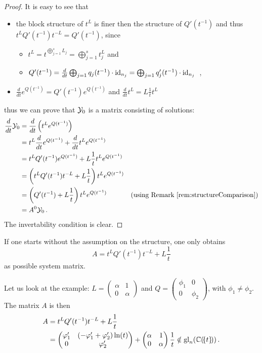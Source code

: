 \begin{proof}
  It is easy to see that
  \begin{itemize}
    \item the block structure of $t^L$ is finer then the structure of
      $Q'(t^{-1})$ and thus $t^LQ'(t^{-1})t^{-L}=Q'(t^{-1})$, since
      \begin{itemize}
        \item $t^L=t^{\bigoplus_{j=1}^sL_j}=\bigoplus_{j=1}^st^L_j$ and
        \item $Q'(t^{-1})=\frac{d}{dt}\bigoplus_{j=1}q_j(t^{-1})\cdot\operatorname{id}_{n_j}=
          \bigoplus_{j=1}q'_j(t^{-1})\cdot\operatorname{id}_{n_j}$ \,,
      \end{itemize}
    \item $\frac{d}{dt}e^{Q(t^{-1})}=Q'(t^{-1})e^{Q(t^{-1})}$ and
      $\frac{d}{dt}t^L=L\frac{1}{t}t^L$
  \end{itemize}
  thus we can prove that $\mathcal{Y}_0$ is a matrix consisting of solutions:
  \begin{align*}
    \frac{d}{dt}\mathcal{Y}_0
    &=\frac{d}{dt}\left(t^Le^{Q(t^{-1})}\right)
  \\&= t^L\frac{d}{dt}e^{Q(t^{-1})} + \frac{d}{dt}t^Le^{Q(t^{-1})}
  \\&= t^LQ'(t^{-1})e^{Q(t^{-1})} + L\frac{1}{t}t^Le^{Q(t^{-1})}
  \\&=\left(t^LQ'(t^{-1})t^{-L}+L\frac{1}{t}\right)t^Le^{Q(t^{-1})}
  \\&=\left(Q'(t^{-1})+L\frac{1}{t}\right)t^Le^{Q(t^{-1})}
    &\text{(using Remark~\ref{rem:structureComparison})}
  \\&=A^0\mathcal{Y}_0 \,.
  \end{align*}
  The invertability condition is clear.
\end{proof}
\begin{rem}
  If one starts without the assumption on the structure, one only obtains
  \[
    A=t^LQ'(t^{-1})t^{-L}+L\frac{1}{t}
  \]
  as possible system matrix.

  Let us look at the example:
  $L=\begin{pmatrix} \alpha & 1 \\ 0 & \alpha \end{pmatrix}$
  and
  $Q=\begin{pmatrix} \phi_1 & 0 \\ 0 & \phi_2 \end{pmatrix}$,
  with
  $\phi_1\neq\phi_2$.
  The matrix $A$ is then 
  \begin{align*}
    A&=t^LQ'(t^{-1})t^{-L}+L\frac{1}{t}
    \\&=
    \begin{pmatrix}
      \varphi_1' & (-\varphi_1'+\varphi_2')\ln(t)
      \\0 & \varphi_2'
    \end{pmatrix} 
    +
    \begin{pmatrix} \alpha & 1 \\ 0 & \alpha \end{pmatrix} \frac{1}{t}
    \notin\operatorname{gl}_n(\mathbb{C}(\!\{t\}\!))
    \,.
  \end{align*}
\end{rem}
